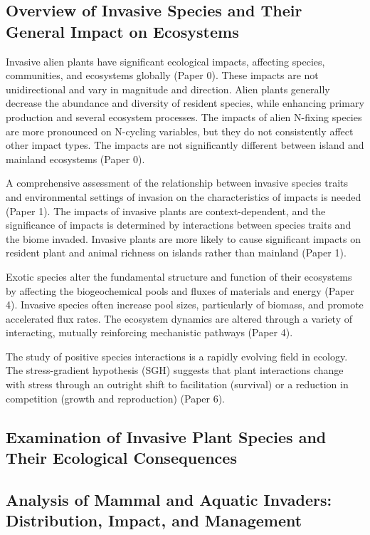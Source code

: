 \documentclass{article}
\begin{document}
\subsection{Overview of Invasive Species and Their General Impact on Ecosystems}

Invasive alien plants have significant ecological impacts, affecting species, communities, and ecosystems globally (Paper 0). These impacts are not unidirectional and vary in magnitude and direction. Alien plants generally decrease the abundance and diversity of resident species, while enhancing primary production and several ecosystem processes. The impacts of alien N-fixing species are more pronounced on N-cycling variables, but they do not consistently affect other impact types. The impacts are not significantly different between island and mainland ecosystems (Paper 0).

A comprehensive assessment of the relationship between invasive species traits and environmental settings of invasion on the characteristics of impacts is needed (Paper 1). The impacts of invasive plants are context-dependent, and the significance of impacts is determined by interactions between species traits and the biome invaded. Invasive plants are more likely to cause significant impacts on resident plant and animal richness on islands rather than mainland (Paper 1).

Exotic species alter the fundamental structure and function of their ecosystems by affecting the biogeochemical pools and fluxes of materials and energy (Paper 4). Invasive species often increase pool sizes, particularly of biomass, and promote accelerated flux rates. The ecosystem dynamics are altered through a variety of interacting, mutually reinforcing mechanistic pathways (Paper 4).

The study of positive species interactions is a rapidly evolving field in ecology. The stress-gradient hypothesis (SGH) suggests that plant interactions change with stress through an outright shift to facilitation (survival) or a reduction in competition (growth and reproduction) (Paper 6).

\subsection{Examination of Invasive Plant Species and Their Ecological Consequences}

\subsection{Analysis of Mammal and Aquatic Invaders: Distribution, Impact, and Management}
\end{document}
